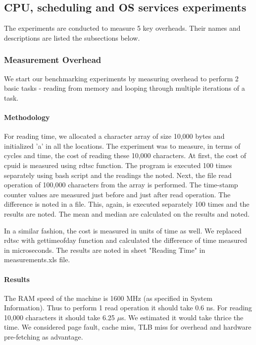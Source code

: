 \documentclass[conference]{IEEEtran}
\begin{document}


\subsection{CPU, scheduling and OS services experiments}

The experiments are conducted to measure 5 key overheads. Their names and descriptions are listed the subsections below.

\subsubsection{Measurement Overhead}

We start our benchmarking experiments by measuring overhead to perform 2 basic tasks - reading from memory and looping through multiple iterations of a task.

\paragraph{Methodology}

For reading time, we allocated a character array of size 10,000 bytes and initialized 'a' in all the locations. The experiment was to measure, in terms of cycles and time, the cost of reading these 10,000 characters. At first, the cost of cpuid is measured using rdtsc function. The program is executed 100 times separately using bash script and the readings the noted. Next, the file read operation of 100,000 characters from the array is performed. The time-stamp counter values are measured just before and just after read operation. The difference is noted in a file. This, again, is executed separately 100 times and the results are noted. The mean and median are calculated on the results and noted.
\par In a similar fashion, the cost is measured in units of time as well. We replaced rdtsc with gettimeofday function and calculated the difference of time measured in microseconds. The results are noted in sheet "Reading Time" in measurements.xls file. 

\paragraph{Results}

The RAM speed of the machine is 1600 MHz (as specified in System Information). 
Thus to perform 1 read operation it should take 0.6 ns. 
For reading 10,000 characters it should take 6.25 $\mu$s. 
We estimated it would take thrice the time. We considered page fault, cache miss, TLB miss for overhead and hardware pre-fetching as advantage.
\end{document}
